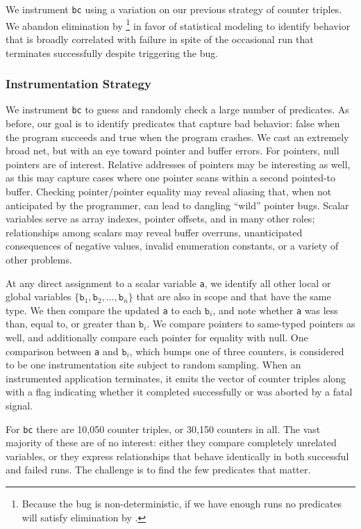 We instrument \texttt{bc} using a variation on our previous strategy
of counter triples.  We abandon elimination by \footnote{Because the bug is non-deterministic, if we
have enough runs no predicates will satisfy elimination by
.} in favor of statistical modeling to
identify behavior that is broadly correlated with failure in spite of
the occasional run that terminates successfully despite triggering the
bug.

\subsubsection{Instrumentation Strategy}

We instrument \texttt{bc} to guess and randomly check a large number
of predicates.  As before, our goal is to identify predicates
that capture bad behavior: false when the program succeeds and true
when the program crashes.  We cast an extremely broad net, but with an
eye toward pointer and buffer errors.  For pointers,
null pointers are of interest.  Relative addresses of pointers
may be interesting as well, as this may capture cases where one
pointer scans within a second pointed-to buffer.  Checking
pointer/pointer equality may reveal aliasing that, when not
anticipated by the programmer, can lead to dangling ``wild'' pointer
bugs.  Scalar variables serve as array indexes, pointer offsets, and
in many other roles; relationships among scalars may reveal buffer
overruns, unanticipated consequences of negative values, invalid
enumeration constants, or a variety of other problems.

At any direct assignment to a scalar variable \texttt{a}, we identify
all other local or global variables $\{ \mathtt{b}_1, \mathtt{b}_2,
\dots, \mathtt{b}_n \}$ that are also in scope and that have the
same type.  We then compare the updated \texttt{a} to each
$\mathtt{b}_i$, and note whether \texttt{a} was less than, equal to,
or greater than $\mathtt{b}_i$.  We compare pointers to same-typed
pointers as well, and additionally compare each pointer for equality
with null.  One comparison between \texttt{a} and $\mathtt{b}_i$,
which bumps one of three counters, is considered to be one
instrumentation site subject to random sampling.  When an instrumented
application terminates, it emits the vector of counter triples along
with a flag indicating whether it completed successfully or was
aborted by a fatal signal.

For \texttt{bc} there are 10,050 counter triples, or 30,150 counters
in all.  The vast majority of these are of no interest: either they
compare completely unrelated variables, or they express relationships
that behave identically in both successful and failed runs.  The
challenge is to find the few predicates that matter.

